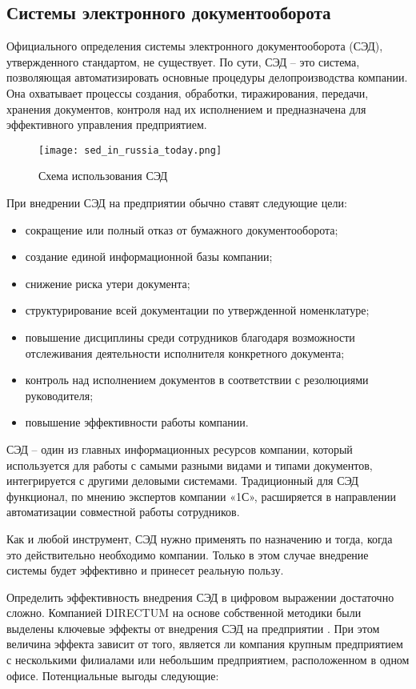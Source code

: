 \subsection{Системы электронного документооборота}
\label{sec:analysis:serv_arch}

Официального определения системы электронного документооборота (СЭД), утвержденного стандартом, не существует. По сути, СЭД – это система, позволяющая автоматизировать основные процедуры делопроизводства компании. Она охватывает процессы создания, обработки, тиражирования, передачи, хранения документов, контроля над их исполнением и предназначена для эффективного управления предприятием.


\begin{figure}[h!]
	\centering
	\texttt{[image: sed\_in\_russia\_today.png]}
	\caption{Схема использования СЭД}
\end{figure}

При внедрении СЭД на предприятии обычно ставят следующие цели:
\begin{itemize}
	\item сокращение или полный отказ от бумажного документооборота; 
	\item создание единой информационной базы компании; 
	\item снижение риска утери документа; 
	\item структурирование всей документации по утвержденной номенклатуре;
	\item повышение дисциплины среди сотрудников благодаря возможности отслеживания деятельности исполнителя конкретного документа;
	\item контроль над исполнением документов в соответствии с резолюциями руководителя;
	\item повышение эффективности работы компании.
\end{itemize}

СЭД – один из главных информационных ресурсов компании, который используется для работы с самыми разными видами и типами документов, интегрируется с другими деловыми системами. Традиционный для СЭД функционал, по мнению экспертов компании «1С», расширяется в направлении автоматизации совместной работы сотрудников.

Как и любой инструмент, СЭД нужно применять по назначению и тогда, когда это действительно необходимо компании. Только в этом случае внедрение системы будет эффективно и принесет реальную пользу.

Определить эффективность внедрения СЭД в цифровом выражении достаточно сложно. Компанией DIRECTUM на основе собственной методики были выделены ключевые эффекты от внедрения СЭД на предприятии \cite{directum}. При этом величина эффекта зависит от того, является ли компания крупным предприятием с несколькими филиалами или небольшим предприятием, расположенном в одном офисе. Потенциальные выгоды следующие:

